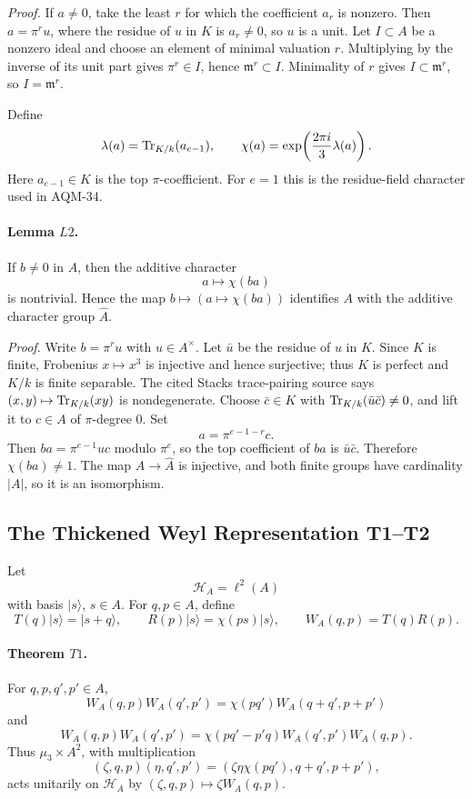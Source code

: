 \emph{Proof.}
If \(a\ne0\), take the least \(r\) for which the coefficient \(a_r\) is
nonzero.  Then \(a=\pi^r u\), where the residue of \(u\) in \(K\) is
\(a_r\ne0\), so \(u\) is a unit.  Let \(I\subset A\) be a nonzero ideal and
choose an element of minimal valuation \(r\).  Multiplying by the inverse of
its unit part gives \(\pi^r\in I\), hence \(\mathfrak m^r\subset I\).
Minimality of \(r\) gives \(I\subset\mathfrak m^r\), so \(I=\mathfrak m^r\).

Define
\[
  \lambda(a)=\operatorname{Tr}_{K/k}(a_{e-1}),\qquad
  \chi(a)=\exp\!\left(\frac{2\pi i}{3}\lambda(a)\right).
\]
Here \(a_{e-1}\in K\) is the top \(\pi\)-coefficient.  For \(e=1\) this is
the residue-field character used in AQM-34.

\paragraph{Lemma \(L2\).}
If \(b\ne0\) in \(A\), then the additive character
\[
  a\longmapsto\chi(ba)
\]
is nontrivial.  Hence the map \(b\mapsto(a\mapsto\chi(ba))\) identifies \(A\)
with the additive character group \(\widehat A\).

\emph{Proof.}
Write \(b=\pi^r u\) with \(u\in A^\times\).  Let \(\bar u\) be the residue of
\(u\) in \(K\).  Since \(K\) is finite, Frobenius \(x\mapsto x^3\) is
injective and hence surjective; thus \(K\) is perfect and \(K/k\) is finite
separable.  The cited Stacks trace-pairing source says
\((x,y)\mapsto\operatorname{Tr}_{K/k}(xy)\) is nondegenerate.
Choose \(\bar c\in K\) with \(\operatorname{Tr}_{K/k}(\bar u\bar c)\ne0\), and lift it to
\(c\in A\) of \(\pi\)-degree \(0\).  Set
\[
  a=\pi^{e-1-r}c.
\]
Then \(ba=\pi^{e-1}uc\) modulo \(\pi^e\), so the top coefficient of \(ba\) is
\(\bar u\bar c\).  Therefore \(\chi(ba)\ne1\).  The map \(A\to\widehat A\) is
injective, and both finite groups have cardinality \(|A|\), so it is an
isomorphism.

\subsection{The Thickened Weyl Representation T1--T2}

Let
\[
  \mathcal H_A=\ell^2(A)
\]
with basis \(|s\rangle\), \(s\in A\).  For \(q,p\in A\), define
\[
  T(q)|s\rangle=|s+q\rangle,\qquad
  R(p)|s\rangle=\chi(ps)|s\rangle,\qquad
  W_A(q,p)=T(q)R(p).
\]

\paragraph{Theorem \(T1\).}
For \(q,p,q',p'\in A\),
\[
  W_A(q,p)W_A(q',p')
  =
  \chi(pq')W_A(q+q',p+p')
\]
and
\[
  W_A(q,p)W_A(q',p')
  =
  \chi(pq'-p'q)W_A(q',p')W_A(q,p).
\]
Thus \(\mu_3\times A^2\), with multiplication
\[
  (\zeta,q,p)(\eta,q',p')
  =
  (\zeta\eta\chi(pq'),q+q',p+p'),
\]
acts unitarily on \(\mathcal H_A\) by
\((\zeta,q,p)\mapsto\zeta W_A(q,p)\).

